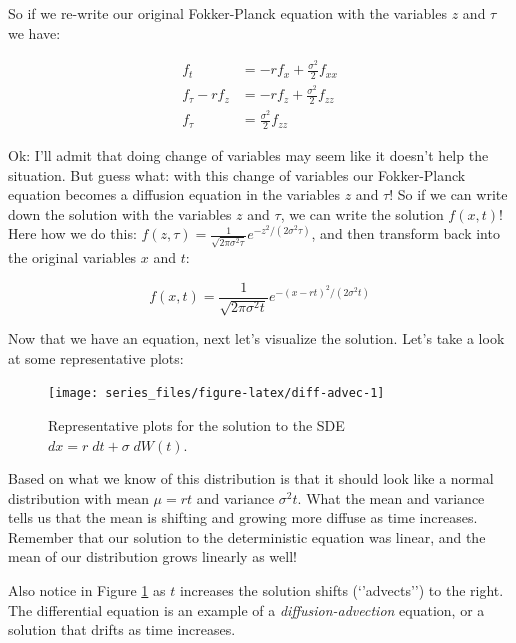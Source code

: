 \documentclass[
]{book}
\theoremstyle{definition}
\theoremstyle{definition}
\theoremstyle{definition}
\theoremstyle{remark}
\begin{document}
So if we re-write our original Fokker-Planck equation with the variables \(z\) and \(\tau\) we have:

\begin{align*}
f_{t} &=-r f_{x}+ \frac{\sigma^{2}}{2} f_{xx} \\
f_{\tau} - r f_{z} &= -r f_{z} + \frac{\sigma^{2}}{2} f_{zz} \\
f_{\tau} &=  \frac{\sigma^{2}}{2} f_{zz}
\end{align*}

Ok: I'll admit that doing change of variables may seem like it doesn't help the situation. But guess what: with this change of variables our Fokker-Planck equation becomes a diffusion equation in the variables \(z\) and \(\tau\)! So if we can write down the solution with the variables \(z\) and \(\tau\), we can write the solution \(f(x,t)\)! Here how we do this: \(\displaystyle f(z, \tau) = \frac{1}{\sqrt{2 \pi \sigma^{2} \tau}} e^{-z^{2}/(2 \sigma^{2} \tau)}\), and then transform back into the original variables \(x\) and \(t\):

\begin{equation}
f(x, t) = \frac{1}{\sqrt{2 \pi \sigma^{2} t}} e^{-(x-rt)^{2}/(2 \sigma^{2} t)}
\end{equation}

Now that we have an equation, next let's visualize the solution. Let's take a look at some representative plots:

\begin{figure}

{\centering \texttt{[image: series\_files/figure-latex/diff-advec-1]} 

}

\caption{Representative plots for the solution to the SDE $dx = r \; dt + \sigma \; dW(t)$.}\label{fig:diff-advec}
\end{figure}

Based on what we know of this distribution is that it should look like a normal distribution with mean \(\mu = rt\) and variance \(\sigma^{2} t\). What the mean and variance tells us that the mean is shifting and growing more diffuse as time increases. Remember that our solution to the deterministic equation was linear, and the mean of our distribution grows linearly as well!

Also notice in Figure \ref{fig:diff-advec} as \(t\) increases the solution shifts (`'advects'') to the right. The differential equation is an example of a \emph{diffusion-advection} equation, or a solution that drifts as time increases.
\end{document}
